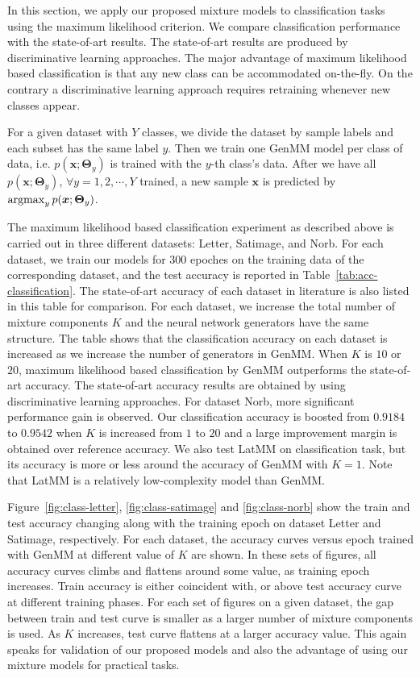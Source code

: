 In this section, we apply our proposed mixture models to classification tasks using the maximum likelihood criterion. We compare classification performance with the state-of-art results. The state-of-art results are produced by discriminative learning approaches. The major advantage of maximum likelihood based classification is that any new class can be accommodated on-the-fly. On the contrary a discriminative learning approach requires retraining whenever new classes appear. 

For a given dataset with $Y$ classes, we divide the dataset by sample labels and each subset has the same label $y$. Then we train one GenMM model per class of data, i.e. $p(\bm{x};\bm{\Theta}_{y})$ is trained with the $y$-th class's data. After we have all $p(\bm{x};\bm{\Theta}_y)$, $\forall y = 1, 2, \cdots, Y$ trained, a new sample $\bm{x}$ is predicted by $\operatorname{argmax}_{y} p(\bm{x};\bm{\Theta}_y)$.

The maximum likelihood based classification experiment as described above is carried out in three different datasets: Letter, Satimage, and Norb. For each dataset, we train our models for $300$ epoches on the training data of the corresponding dataset, and the test accuracy is reported in Table~\ref{tab:acc-classification}. The state-of-art accuracy of each dataset in literature is also listed in this table for comparison. For each dataset, we increase the total number of mixture components $K$ and the neural network generators have the same structure. The table shows that the classification accuracy on each dataset is increased as we increase the number of generators in GenMM. When $K$ is $10$ or $20$, maximum likelihood based classification by GenMM outperforms the state-of-art accuracy. The state-of-art accuracy results are obtained by using discriminative learning approaches. For dataset Norb, more significant performance gain is observed. Our classification accuracy is boosted from $0.9184$ to $0.9542$ when $K$ is increased from $1$ to $20$ and a large improvement margin is obtained over reference accuracy. We also test LatMM on classification task, but its accuracy is more or less around the accuracy of GenMM with $K=1$. Note that LatMM is a relatively low-complexity model than GenMM. 

Figure~\ref{fig:class-letter}, \ref{fig:class-satimage} and \ref{fig:class-norb} show the train and test accuracy changing along with the training epoch on dataset Letter and Satimage, respectively. For each dataset, the accuracy curves versus epoch trained with GenMM at different value of $K$ are shown. In these sets of figures, all accuracy curves climbs and flattens around some value, as training epoch increases. Train accuracy is either coincident with, or above test accuracy curve at different training phases. For each set of figures on a given dataset, the gap between train and test curve is smaller as a larger number of mixture components is used. As $K$ increases, test curve flattens at a larger accuracy value. This again speaks for validation of our proposed models and also the advantage of using our mixture models for practical tasks.

